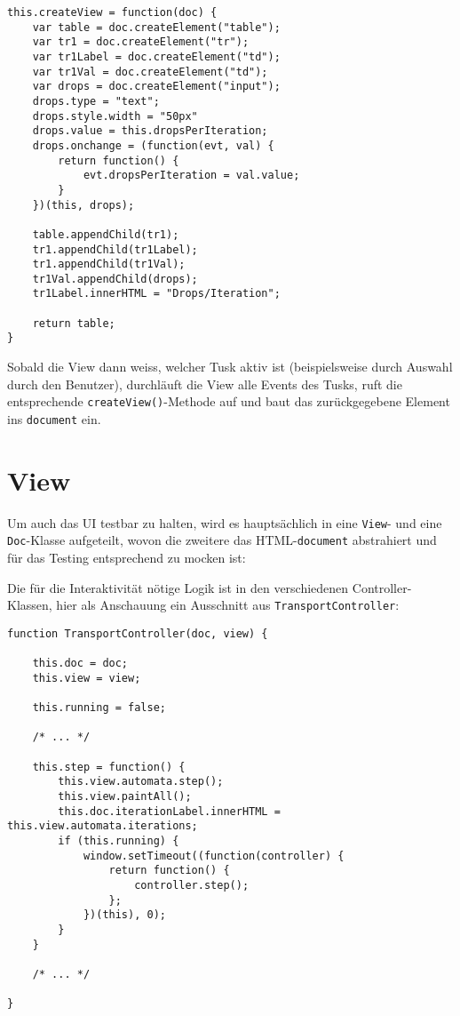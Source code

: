 \documentclass[11pt]{scrreprt} %
\theoremstyle{definition}
\begin{document}
\begin{lstlisting}
this.createView = function(doc) {
	var table = doc.createElement("table");
	var tr1 = doc.createElement("tr");
	var tr1Label = doc.createElement("td");
	var tr1Val = doc.createElement("td");
	var drops = doc.createElement("input");
	drops.type = "text";
	drops.style.width = "50px"
	drops.value = this.dropsPerIteration;
	drops.onchange = (function(evt, val) {
		return function() {
			evt.dropsPerIteration = val.value;
		}
	})(this, drops);
	
	table.appendChild(tr1);
	tr1.appendChild(tr1Label);
	tr1.appendChild(tr1Val);
	tr1Val.appendChild(drops);
	tr1Label.innerHTML = "Drops/Iteration";
	
	return table;
}
\end{lstlisting}

Sobald die View dann weiss, welcher Tusk aktiv ist (beispielsweise durch Auswahl durch den Benutzer), durchläuft die View alle Events des Tusks, ruft die entsprechende {\tt createView()}-Methode auf und baut das zurückgegebene Element ins {\tt document} ein.

\section{View}

Um auch das UI testbar zu halten, wird es hauptsächlich in eine {\tt View}- und eine {\tt Doc}-Klasse aufgeteilt, wovon die zweitere das HTML-{\tt document} abstrahiert und für das Testing entsprechend zu mocken ist:


Die für die Interaktivität nötige Logik ist in den verschiedenen Controller-Klassen, hier als Anschauung ein Ausschnitt aus {\tt TransportController}:

\begin{lstlisting}
function TransportController(doc, view) {
	
	this.doc = doc;
	this.view = view;
	
	this.running = false;

	/* ... */

	this.step = function() {
		this.view.automata.step();
		this.view.paintAll();
		this.doc.iterationLabel.innerHTML = this.view.automata.iterations;
		if (this.running) {
			window.setTimeout((function(controller) {
				return function() {
					controller.step();
				};
			})(this), 0);
		}
	}

	/* ... */

}
\end{lstlisting}
\end{document}
